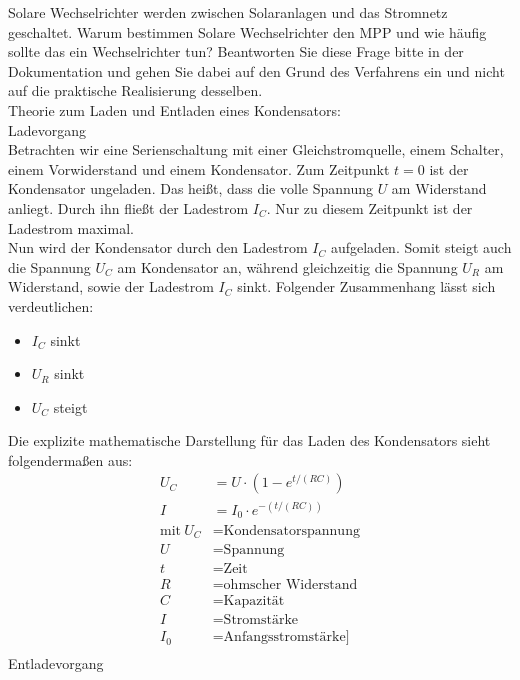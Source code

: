 Solare Wechselrichter werden zwischen Solaranlagen und das Stromnetz geschaltet.
Warum bestimmen Solare Wechselrichter den MPP und wie häufig sollte das ein Wechselrichter
tun? Beantworten Sie diese Frage bitte in der Dokumentation und gehen Sie
dabei auf den Grund des Verfahrens ein und nicht auf die praktische Realisierung desselben.\\

Theorie zum Laden und Entladen eines Kondensators:\\
Ladevorgang\\
Betrachten wir eine Serienschaltung mit einer Gleichstromquelle, einem Schalter, einem Vorwiderstand und einem Kondensator. 
Zum Zeitpunkt $t = 0$ ist der Kondensator ungeladen. Das heißt, dass die volle Spannung $U$ am Widerstand anliegt. Durch ihn fließt der Ladestrom $I_C$. Nur zu diesem Zeitpunkt ist der Ladestrom maximal.\\
Nun wird der Kondensator durch den Ladestrom $I_C$ aufgeladen. Somit steigt auch die Spannung $U_C$ am Kondensator an, während gleichzeitig die Spannung $U_R$ am Widerstand, sowie der Ladestrom $I_C$ sinkt. Folgender Zusammenhang lässt sich verdeutlichen:\\
\begin{itemize}
\item $I_C$ sinkt
\end{itemize}
\begin{itemize}
\item $U_R $ sinkt
\end{itemize}
\begin{itemize}
\item $U_C $ steigt
\end{itemize}
Die explizite mathematische Darstellung für das Laden des Kondensators sieht folgendermaßen aus:
\begin{align*}
U_C &= U \cdot (1 - e^{t/(RC)})\\
I &= I_0 \cdot e^{-(t/(RC))}\\
\text{mit} \ U_C &= \text{Kondensatorspannung}\\
U &= \text{Spannung}\\
t &= \text{Zeit}\\
R &= \text{ohmscher Widerstand}\\
C &= \text{Kapazität}\\
I &= \text{Stromstärke}\\
I_0 &= \text{Anfangsstromstärke]}\\
\end{align*}
Entladevorgang\\
